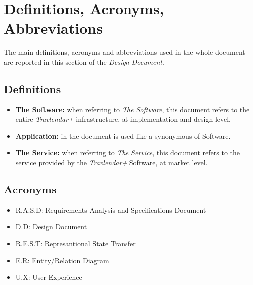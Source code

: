 \section{Definitions, Acronyms, Abbreviations}
The main definitions, acronyms and abbreviations used in the whole document are reported in this section of the \emph{Design Document}.

\subsection{Definitions}
\begin{itemize}
    \item   \textbf{The Software:} when referring to \emph{The Software}, this document refers to the entire                  \emph{Travlendar+} infrastructure, at implementation and design level.
        
    \item   \textbf{Application:} in the document is used like a synonymous of Software.
  
    \item   \textbf{The Service:}  when referring to \emph{The Service}, this document refers to the service provided         by the \emph{Travlendar+} Software, at market level.
\end{itemize}

\subsection{Acronyms}
\begin{itemize}
    \item R.A.S.D: Requirements Analysis and Specifications Document
    \item D.D: Design Document
    \item R.E.S.T: Represantional State Transfer
    \item E.R: Entity/Relation Diagram
    \item U.X: User Experience
\end{itemize}